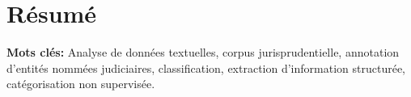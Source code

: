 \chapter*{Résumé}

\textbf{Mots clés:} Analyse de données textuelles, corpus jurisprudentielle, annotation d'entités nommées judiciaires, classification, extraction d'information structurée, catégorisation non supervisée.

